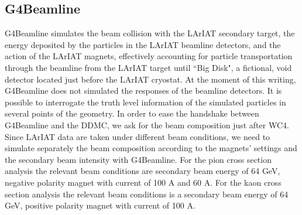 \subsection{G4Beamline}\label{ch:beamlineComposition}
G4Beamline simulates the beam collision with the LArIAT secondary target, the energy deposited by the particles in the LArIAT beamline detectors, and the action of the LArIAT magnets, effectively accounting for particle transportation through the beamline from the LArIAT target until ``Big Disk", a fictional, void detector located just before the LArIAT cryostat. 
 At the moment of this writing, G4Beamline does not simulated the responses of the beamline detectors. It is possible to interrogate the truth level information of the simulated particles in several points of the geometry. In order to ease the handshake between G4Beamline and the DDMC, we ask for the beam composition just after WC4.
Since LArIAT data are taken under different beam conditions, we need to simulate separately the beam composition according to the magnets' settings and the secondary beam intensity with G4Beamline. For the pion cross section analysis the relevant beam conditions are  secondary beam energy of 64 GeV, negative polarity magnet with current of 100 A and 60 A. For the kaon cross section analysis the relevant beam conditions is a secondary beam energy of 64 GeV, positive polarity magnet with current of 100 A. 

